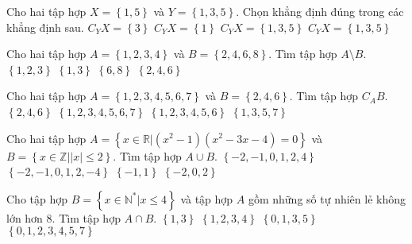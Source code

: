 \begin{ex}%
	Cho hai tập hợp $X=\left\{ 1, 5\right\}$ và $Y=\left\{  1, 3, 5\right\}$. Chọn khẳng định đúng trong các khẳng định sau.
	\choice
	{\True $C_{Y}X= \left\{ 3 \right\}$}
	{$C_{Y}X=\left\{ 1 \right\}$}
	{$C_{Y}X=\left\{ 1, 3, 5 \right\}$}
	{$C_{Y}X=\left\{ 1, 3, 5 \right\}$}
\end{ex}
\begin{ex}%
	Cho hai tập hợp $A=\left\{1,2,3,4\right\}$ và $B=\left\{2,4,6,8\right\}$. Tìm tập hợp $A\setminus B$.
	\choice
	{$\left\{1,2,3\right\}$}
	{\True $\left\{1,3\right\}$}
	{$\left\{6,8\right\}$}
	{$\left\{2,4,6\right\}$}
\end{ex}

\begin{ex}%
	Cho hai tập hợp $A=\left\{1,2,3,4,5,6,7\right\}$ và $B=\left\{2,4,6\right\}$. Tìm tập hợp $C_AB$.
	\choice
	{$\left\{2,4,6\right\}$}
	{$\left\{1,2,3,4,5,6,7\right\}$}
	{$\left\{1,2,3,4,5,6\right\}$}
	{\True $\left\{1,3,5,7\right\}$}
\end{ex}

\begin{ex}%
	Cho hai tập hợp $A=\left\{ x\in \mathbb{R}\big|\left(x^2-1 \right)\left( x^2-3x-4 \right)=0 \right\}$ và $B=\left\{ x\in \mathbb{Z}\big|\left| x \right|\leq 2 \right\}$. Tìm tập hợp $A\cup B$.
	\choice
	{\True $\left\{ -2,-1,0,1,2, 4 \right\}$}
	{$\left\{ -2,-1,0,1,2, -4 \right\}$}
	{$\left\{-1, 1 \right\}$}
	{$\left\{-2, 0, 2\right\}$}
\end{ex}

\begin{ex}%
	Cho tập hợp $B = \left\{x \in \mathbb{N}^* \big| x \leq 4\right\}$ và tập hợp $A$ gồm những số tự nhiên lẻ không lớn hơn $8$. Tìm tập hợp $A \cap B$. 
	\choice
	{\True $\left\{1, 3\right\}$}
	{$\left\{1, 2, 3, 4\right\}$}
	{$\left\{0, 1, 3, 5\right\}$}
	{$\left\{0, 1, 2, 3, 4, 5, 7\right\}$}
\end{ex}

